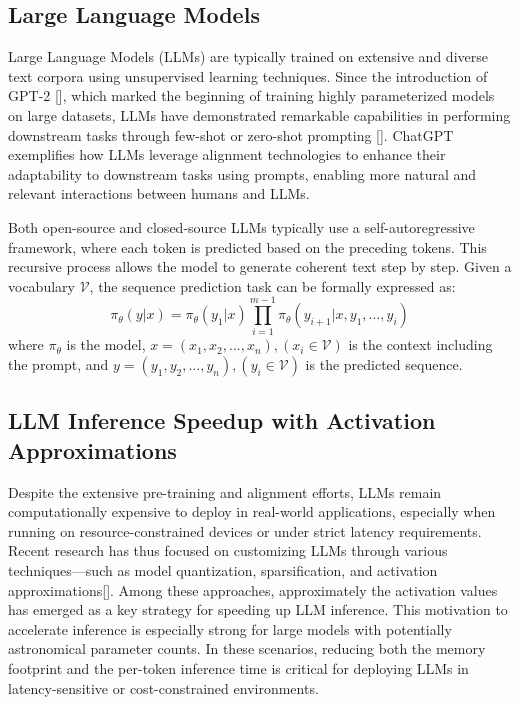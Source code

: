 
\subsection{Large Language Models}
\label{llm objective}
Large Language Models (LLMs) are typically trained on extensive and diverse text corpora using unsupervised learning techniques. Since the introduction of GPT-2 [], which marked the beginning of training highly parameterized models on large datasets, LLMs have demonstrated remarkable capabilities in performing downstream tasks through few-shot or zero-shot prompting []. ChatGPT exemplifies how LLMs leverage alignment technologies to enhance their adaptability to downstream tasks using prompts, enabling more natural and relevant interactions between humans and LLMs.

Both open-source and closed-source LLMs typically use a self-autoregressive framework, where each token is predicted based on the preceding tokens. This recursive process allows the model to generate coherent text step by step. Given a vocabulary $\mathcal{V}$, the sequence prediction task can be formally expressed as: $$\pi_{\theta}(y|x)=\pi_{\theta}(y_1|x)\prod_{i=1}^{m-1}\pi_{\theta}(y_{i+1}|x,y_1,...,y_i)$$ where $\pi_{\theta}$ is the model, $x=(x_1,x_2,...,x_n),(x_i \in \mathcal{V})$ is the context including the prompt, and $y=(y_1,y_2,...,y_n),(y_i \in \mathcal{V})$ is the predicted sequence.

\subsection{LLM Inference Speedup with Activation Approximations}

Despite the extensive pre-training and alignment efforts, LLMs remain computationally expensive to deploy in real-world applications, especially when running on resource-constrained devices or under strict latency requirements. Recent research has thus focused on customizing LLMs through various techniques—such as model quantization, sparsification, and activation approximations[].  Among these approaches, approximately the activation values has emerged as a key strategy for speeding up LLM inference. This motivation to accelerate inference is especially strong for large models with potentially astronomical parameter counts. In these scenarios, reducing both the memory footprint and the per-token inference time is critical for deploying LLMs in latency-sensitive or cost-constrained environments.

